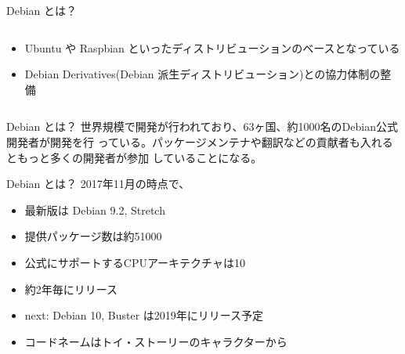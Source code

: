 \documentclass[cjk,c,squeeze,shrink,dvipdfmx,12pt]{beamer}
\begin{document}
\begin{frame}[fragile]{Debian とは？}
  \begin{columns}
    \begin{column}{.58\paperwidth}
      \begin{itemize}
      \item
        Ubuntu や Raspbian といったディストリビューションのベースとなっている
      \item
        Debian Derivatives(Debian 派生ディストリビューション)との協力体制の整備
      \end{itemize}
    \end{column}
  \end{columns}
\end{frame}


\begin{frame}[fragile]{Debian とは？}
 世界規模で開発が行われており、63ヶ国、約1000名のDebian公式開発者が開発を行
 っている。パッケージメンテナや翻訳などの貢献者も入れるともっと多くの開発者が参加
 していることになる。

 \centering
\end{frame}


\begin{frame}[fragile]{Debian とは？}
  2017年11月の時点で、
  \pause
  \begin{itemize}[<+->]
  \item
    最新版は {\alert{Debian 9.2}}, Stretch
  \item
    提供パッケージ数は{\alert{約51000}}
  \item
    公式にサポートするCPUアーキテクチャは{\alert{10}}
  \item {\alert{約2年毎}}にリリース
  \item next: Debian 10, Buster は2019年にリリース予定
  \item コードネームはトイ・ストーリーのキャラクターから
  \end{itemize}
\end{frame}
\end{document}
